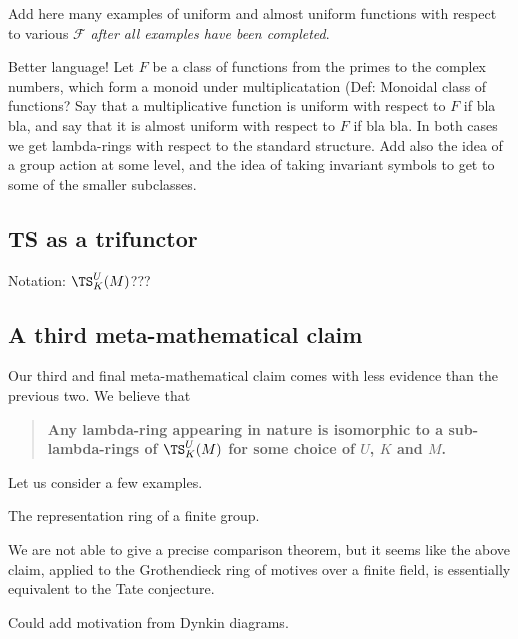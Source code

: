 \begin{example}
Add here many examples of uniform and almost uniform functions with respect to various $\mathcal{F}$ \emph{after all examples have been completed}.
\end{example}

Better language! Let $F$ be a class of functions from the primes to the complex numbers, which form a monoid under multiplicatation (Def: Monoidal class of functions? Say that a multiplicative function is uniform with respect to $F$ if bla bla, and say that it is almost uniform with respect to $F$ if bla bla. In both cases we get lambda-rings with respect to the standard structure. Add also the idea of a group action at some level, and the idea of taking invariant symbols to get to some of the smaller subclasses.


\subsection{\textbf{TS} as a trifunctor}

Notation: $\TS_K^U(M)$???
\subsection{A third meta-mathematical claim}

Our third and final meta-mathematical claim comes with less evidence than the previous two. We  believe that

\begin{quote}
\textbf{Any lambda-ring appearing in nature is isomorphic to a sub-lambda-rings of $\TS^U_K(M)$ for some choice of $U$, $K$ and $M$.}
\end{quote}


Let us consider a few examples.

\begin{example}
The representation ring of a finite group.  
\end{example}

\begin{example}
We are not able to give a precise comparison theorem, but it seems like the above claim, applied to the Grothendieck ring of motives over a finite field, is essentially equivalent to the Tate conjecture.
\end{example}

\begin{example}
Could add motivation from Dynkin diagrams.
\end{example}

